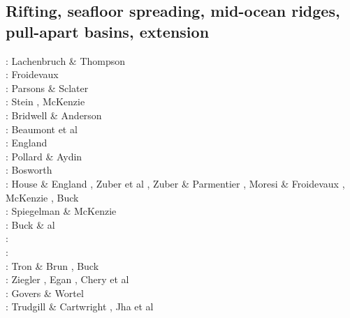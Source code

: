 \subsection{Rifting, seafloor spreading, mid-ocean ridges, pull-apart basins, extension}

\begin{scriptsize}
\nineteenseventytwo: Lachenbruch \& Thompson \cite{lath72}\\
\nineteenseventythree: Froidevaux \cite{froi73}\\
\nineteenseventyseven: Parsons \& Sclater \cite{pasc77}\\
\nineteenseventyeight: Stein \cite{stei78}, McKenzie \cite{mcke78}\\
\nineteeneighty: Bridwell \& Anderson \cite{bran80}\\
\nineteeneightytwo: Beaumont et al \cite{bekb82}\\
\nineteeneightythree: England \cite{engl83}\\
\nineteeneightyfour: Pollard \& Aydin \cite{poay84}\\
\nineteeneightyfive: Bosworth \cite{bosw85}\\
\nineteeneightysix: House \& England \cite{hoen86b}, Zuber et al \cite{zupf86}, 
                    Zuber \& Parmentier \cite{zupa86}, Moresi \& Froidevaux \cite{mofr86},
                    McKenzie \cite{mcke86}, Buck \cite{buck86}\\
\nineteeneightyseven: Spiegelman \& McKenzie \cite{spmc87}\\
\nineteeneightyeight: Buck \& al \cite{bums88}\\
\nineteeneightynine: \cite{mewi89}\cite{brbe89}\cite{ismb89}\cite{soen89}\cite{brbe89b}\cite{brbe89c}\\
\nineteenninety: \cite{fara90}\cite{lipa90}\cite{mccl90}\cite{chmo90}\cite{chmo90b}\\
\nineteenninetyone: Tron \& Brun \cite{trbr91}, Buck \cite{buck91}\\
\nineteenninetytwo: Ziegler \cite{zieg92b}, Egan \cite{egan92}, Chery et al \cite{chld92}\\
\nineteenninetythree: Govers \& Wortel \cite{gowo93}\\
\nineteenninetyfour: Trudgill \& Cartwright \cite{trca94}, Jha et al \cite{jhpp94}\\

\end{scriptsize}
